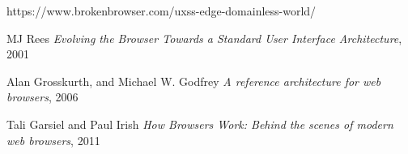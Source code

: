 \documentclass[journal]{IEEEtran}
\begin{document}

\begin{thebibliography}{1}

https://www.brokenbrowser.com/uxss-edge-domainless-world/

MJ Rees
\textit{Evolving the Browser Towards a Standard User Interface Architecture}, 2001

Alan Grosskurth, and Michael W. Godfrey
\textit{A reference architecture for web browsers}, 2006

Tali Garsiel and Paul Irish
\textit{How Browsers Work: Behind the scenes of modern web browsers}, 2011

\end{thebibliography}

\ifCLASSOPTIONcaptionsoff
  \newpage
\fi





%
%
%

% 






\end{document}
